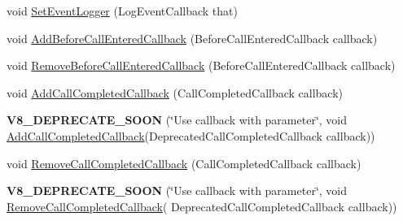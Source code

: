 \begin{DoxyCompactItemize}
$$\item 
void \hyperlink{classv8_1_1_isolate_a28bf18f2f6ed468ec97f59df682e73c1}{Set\+Event\+Logger} (Log\+Event\+Callback that)
\item 
void \hyperlink{classv8_1_1_isolate_a1affdbf27486aa4c6a1ecae9997de98e}{Add\+Before\+Call\+Entered\+Callback} (Before\+Call\+Entered\+Callback callback)
\item 
void \hyperlink{classv8_1_1_isolate_a92be6cf5ce1e7360843794cc1528369f}{Remove\+Before\+Call\+Entered\+Callback} (Before\+Call\+Entered\+Callback callback)
\item 
void \hyperlink{classv8_1_1_isolate_a89656ac26d523c31fbfdbb12fb32f078}{Add\+Call\+Completed\+Callback} (Call\+Completed\+Callback callback)
\item 
{\bfseries V8\+\_\+\+D\+E\+P\+R\+E\+C\+A\+T\+E\+\_\+\+S\+O\+ON} (\char`\"{}Use callback with parameter\char`\"{}, void \hyperlink{classv8_1_1_isolate_a89656ac26d523c31fbfdbb12fb32f078}{Add\+Call\+Completed\+Callback}(Deprecated\+Call\+Completed\+Callback callback))\hypertarget{classv8_1_1_isolate_ab025ed92093822d1ed87c7669c207b4e}{}\label{classv8_1_1_isolate_ab025ed92093822d1ed87c7669c207b4e}

\item 
void \hyperlink{classv8_1_1_isolate_a46f0a5d35f8b29030922bdb433c0dc4f}{Remove\+Call\+Completed\+Callback} (Call\+Completed\+Callback callback)
\item 
{\bfseries V8\+\_\+\+D\+E\+P\+R\+E\+C\+A\+T\+E\+\_\+\+S\+O\+ON} (\char`\"{}Use callback with parameter\char`\"{}, void \hyperlink{classv8_1_1_isolate_a46f0a5d35f8b29030922bdb433c0dc4f}{Remove\+Call\+Completed\+Callback}(                               Deprecated\+Call\+Completed\+Callback callback))\hypertarget{classv8_1_1_isolate_a4ba659f54c46de49b75c4ca41e55535c}{}\label{classv8_1_1_isolate_a4ba659f54c46de49b75c4ca41e55535c}


\end{DoxyCompactItemize}

